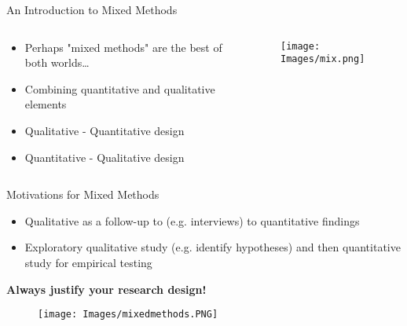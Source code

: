 \documentclass[10pt, aspectratio=169]{beamer}
\begin{document}
\begin{frame}{An Introduction to Mixed Methods}
    \begin{columns}
        \begin{column}{0.6\textwidth}
    \begin{itemize}
        \item Perhaps "mixed methods" are the best of both worlds…\vspace{0.3cm}
        \item Combining quantitative and qualitative elements\vspace{0.3cm}
        \item Qualitative - Quantitative design\vspace{0.3cm}
        \item Quantitative - Qualitative design
    \end{itemize}
    \end{column}
    \begin{column}{0.4\textwidth}
    \begin{figure}
    \centering
    \texttt{[image: Images/mix.png]}
    \label{fig:ethical-considerations}
\end{figure}
    \end{column}
    \end{columns}
\end{frame}

\begin{frame}{Motivations for Mixed Methods}
    \begin{itemize}
        \item Qualitative as a follow-up to (e.g. interviews) to quantitative findings\vspace{0.3cm}
        \item Exploratory qualitative study (e.g. identify hypotheses) and then quantitative study for empirical testing\vspace{0.3cm}
    \end{itemize}
\centering
\textbf{Always justify your research design! }
\begin{figure}
    \centering
    \texttt{[image: Images/mixedmethods.PNG]}
    \label{fig:enter-label}
\end{figure}
\end{frame}
\end{document}
